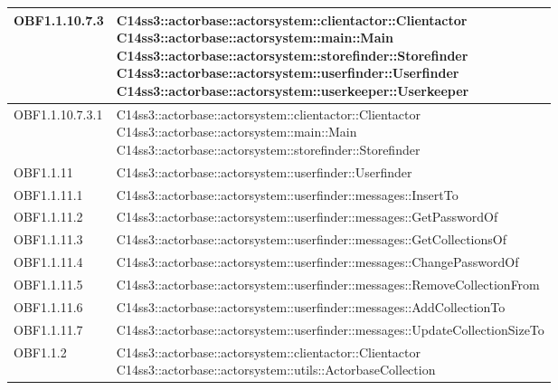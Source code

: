 \documentclass{scalatekids-article}
\begin{document}
\begin{longtable}[H]{|p{4.5cm}|p{13cm}|}
\hline
OBF1.1.10.7.3 & \multiLineCell[t]{C14ss3::actorbase::actorsystem::clientactor::Clientactor\\C14ss3::actorbase::actorsystem::main::Main\\C14ss3::actorbase::actorsystem::storefinder::Storefinder\\C14ss3::actorbase::actorsystem::userfinder::Userfinder\\C14ss3::actorbase::actorsystem::userkeeper::Userkeeper\\}\\
\hline
OBF1.1.10.7.3.1 & \multiLineCell[t]{C14ss3::actorbase::actorsystem::clientactor::Clientactor\\C14ss3::actorbase::actorsystem::main::Main\\C14ss3::actorbase::actorsystem::storefinder::Storefinder\\}\\
\hline
OBF1.1.11 & \multiLineCell[t]{C14ss3::actorbase::actorsystem::userfinder::Userfinder\\}\\
\hline
OBF1.1.11.1 & \multiLineCell[t]{C14ss3::actorbase::actorsystem::userfinder::messages::InsertTo\\}\\
\hline
OBF1.1.11.2 & \multiLineCell[t]{C14ss3::actorbase::actorsystem::userfinder::messages::GetPasswordOf\\}\\
\hline
OBF1.1.11.3 & \multiLineCell[t]{C14ss3::actorbase::actorsystem::userfinder::messages::GetCollectionsOf\\}\\
\hline
OBF1.1.11.4 & \multiLineCell[t]{C14ss3::actorbase::actorsystem::userfinder::messages::ChangePasswordOf\\}\\
\hline
OBF1.1.11.5 & \multiLineCell[t]{C14ss3::actorbase::actorsystem::userfinder::messages::RemoveCollectionFrom\\}\\
\hline
OBF1.1.11.6 & \multiLineCell[t]{C14ss3::actorbase::actorsystem::userfinder::messages::AddCollectionTo\\}\\
\hline
OBF1.1.11.7 & \multiLineCell[t]{C14ss3::actorbase::actorsystem::userfinder::messages::UpdateCollectionSizeTo\\}\\
\hline
OBF1.1.2 & \multiLineCell[t]{C14ss3::actorbase::actorsystem::clientactor::Clientactor\\C14ss3::actorbase::actorsystem::utils::ActorbaseCollection\\}\\

\end{longtable}
\end{document}
